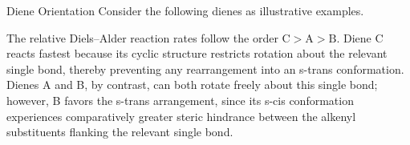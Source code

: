 \begin{core}{Diene Orientation}
      Consider the following dienes as illustrative examples.


      The relative Diels--Alder reaction rates follow the order $\text{C} > \text{A} > \text{B}$. Diene C reacts fastest because its cyclic structure restricts rotation about the relevant single bond, thereby preventing any rearrangement into an s-trans conformation. Dienes A and B, by contrast, can both rotate freely about this single bond; however, B favors the s-trans arrangement, since its s-cis conformation experiences comparatively greater steric hindrance between the alkenyl substituents flanking the relevant single bond.

    \end{core}

